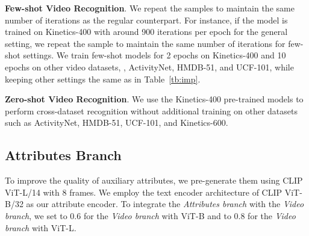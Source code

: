 \documentclass[10pt,twocolumn,letterpaper]{article}
\begin{document}
\noindent\textbf{Few-shot Video Recognition}.
We repeat the samples to maintain the same number of iterations as the regular counterpart. For instance, if the model is trained on Kinetics-400 with around 900 iterations per epoch for the general setting, we repeat the sample to maintain the same number of iterations for few-shot settings. We train few-shot models for 2 epochs on Kinetics-400 and 10 epochs on other video datasets, \ie, ActivityNet, HMDB-51, and UCF-101, while keeping other settings the same as in Table~\ref{tb:imp}.


\noindent\textbf{Zero-shot Video Recognition}. 
We use the Kinetics-400 pre-trained models to perform cross-dataset recognition without additional training on other datasets such as ActivityNet, HMDB-51, UCF-101, and Kinetics-600.



\subsection{Attributes Branch}\label{sec:attr}
To improve the quality of auxiliary attributes, we pre-generate them using CLIP ViT-L/14 with 8 frames. We employ the text encoder architecture of CLIP ViT-B/32 as our attribute encoder.
To integrate the \emph{Attributes branch} with the \emph{Video branch}, we set  to 0.6 for the \emph{Video branch} with ViT-B and  to 0.8 for the \emph{Video branch} with ViT-L.


\begin{table}[h!]
\centering
{}
\caption{Default training recipe for video recognition.}
\label{tb:imp}
\end{table}
\end{document}
